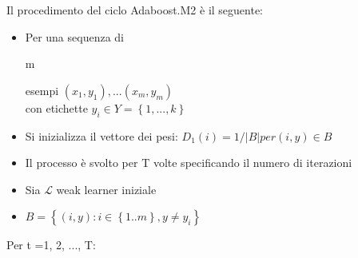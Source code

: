 Il procedimento del ciclo Adaboost.M2 \`e il seguente:\\
\newline
\begin{itemize}
\item Per una sequenza di \begin{it}m\end{it} esempi \begin{math}(x_1,y_1), ... (x_m,y_m)\end{math}\\
con etichette \begin{math}y_i\in Y = \left\{1, ..., k\right\}\end{math}
\item Si inizializza il vettore dei pesi: \begin{math} D_1(i)=1/|B| per (i,y) \in B \end{math}
\item Il processo \`e svolto per T volte specificando il numero di iterazioni
\item Sia \begin{math} \mathcal{L} \end{math} weak learner iniziale
\item \begin{math} B=\left\{(i,y) : i \in \left\{1..m\right\},y\ne y_i\right\} \end{math}

\end{itemize}
Per t =1, 2, ..., T:
